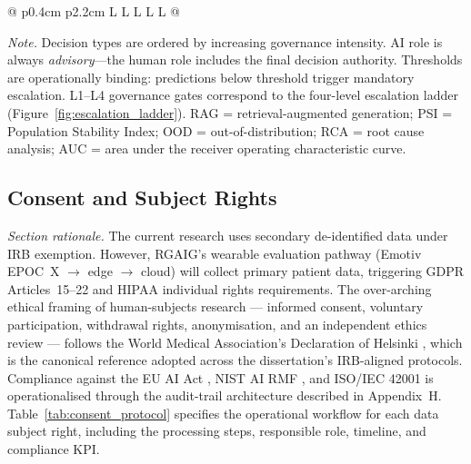 \begin{table}[!htbp]
\begin{tabularx}{\textwidth}{@{} p{0.4cm} p{2.2cm} L L L L L @{}}
\bottomrule
\end{tabularx}
\vspace{0.5em}\noindent\textit{Note.} Decision types are ordered by increasing governance intensity. AI role is always \textit{advisory}---the human role includes the final decision authority. Thresholds are operationally binding: predictions below threshold trigger mandatory escalation. L1--L4 governance gates correspond to the four-level escalation ladder (Figure~\ref{fig:escalation_ladder}). RAG = retrieval-augmented generation; PSI = Population Stability Index; OOD = out-of-distribution; RCA = root cause analysis; AUC = area under the receiver operating characteristic curve.
\end{table}
\fi %

\subsection{Consent and Subject Rights}

\textit{Section rationale.} The current research uses secondary de-identified data under IRB exemption. However, RGAIG's wearable evaluation pathway (Emotiv EPOC~X $\to$ edge $\to$ cloud) will collect primary patient data, triggering GDPR Articles~15--22 and HIPAA individual rights requirements. The over-arching ethical framing of human-subjects research --- informed consent, voluntary participation, withdrawal rights, anonymisation, and an independent ethics review --- follows the World Medical Association's Declaration of Helsinki \cite{wma2013helsinki}, which is the canonical reference adopted across the dissertation's IRB-aligned protocols. Compliance against the EU AI Act \cite{euaiact2024}, NIST AI RMF \cite{nist2023airmf}, and ISO/IEC 42001 \cite{iso2023ai42001} is operationalised through the audit-trail architecture described in Appendix~H. Table~\ref{tab:consent_protocol} specifies the operational workflow for each data subject right, including the processing steps, responsible role, timeline, and compliance KPI.

